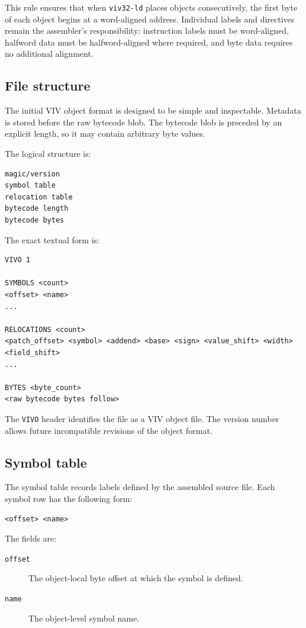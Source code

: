This rule ensures that when \texttt{viv32-ld} places objects consecutively, the first
byte of each object begins at a word-aligned address. Individual labels and directives
remain the assembler's responsibility: instruction labels must be word-aligned, halfword
data must be halfword-aligned where required, and byte data requires no additional
alignment.

\subsection{File structure}

The initial VIV object format is designed to be simple and inspectable. Metadata is
stored before the raw bytecode blob. The bytecode blob is preceded by an explicit
length, so it may contain arbitrary byte values.

The logical structure is:

\begin{verbatim}
magic/version
symbol table
relocation table
bytecode length
bytecode bytes
\end{verbatim}

The exact textual form is:

\begin{verbatim}
VIVO 1

SYMBOLS <count>
<offset> <name>
...

RELOCATIONS <count>
<patch_offset> <symbol> <addend> <base> <sign> <value_shift> <width> <field_shift>
...

BYTES <byte_count>
<raw bytecode bytes follow>
\end{verbatim}

The \texttt{VIVO} header identifies the file as a VIV object file. The version number
allows future incompatible revisions of the object format.

\subsection{Symbol table}

The symbol table records labels defined by the assembled source file. Each symbol row
has the following form:

\begin{verbatim}
<offset> <name>
\end{verbatim}

The fields are:

\begin{description}
    \item[\texttt{offset}] The object-local byte offset at which the symbol is defined.
    \item[\texttt{name}] The object-level symbol name.
\end{description}

